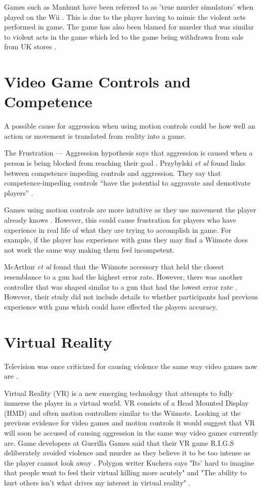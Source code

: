 \documentclass{scrartcl}
\begin{document}
Games such as Manhunt have been referred to as 'true murder simulators' when played on the Wii \cite{Manhunt}. This is due to the player having to mimic the violent acts performed in game. 
The game has also been blamed for murder that was similar to violent acts in the game which led to the game being withdrawn from sale from UK stores \cite{Manhunt2Ban, ManhuntMurder}.  

\section{Video Game Controls and Competence}
A possible cause for aggression when using motion controls could be how well an action or movement is translated from reality into a game.  

The Frustration --- Aggression hypothesis says that aggression is caused when a person is being blocked from reaching their goal \cite{dollard1939frustration}.  Przybylski \textit{et al} found links between competence impeding controls and aggression. They say that competence-impeding controls ``have the potential to aggravate and demotivate players” \cite{przybylski}.

Games using motion controls are more intuitive as they use movement the player already knows \cite{Kim}.   However, this could cause frustration for players who have experience in real life of what they are trying to accomplish in game.  For example, if the player has experience with guns they may find a Wiimote does not work the same way making them feel incompetent.
\bigskip

McArthur \textit{et al} found that the Wiimote accessory that held the closest resemblance to a gun had the highest error rate. However, there was another controller that was shaped similar to a gun that had the lowest error rate \cite{McArthur}.  However, their study did not include details to whether participants had previous experience with guns which could have effected the players accuracy. 

 
\section{Virtual Reality}
Television was once criticized for causing violence the same way video games now are \cite{sherry2001effects}. 

Virtual Reality (VR) is a new emerging technology that attempts to fully immerse the player in a virtual world.   VR consists of a Head Mounted Display (HMD) and often motion controllers similar to the Wiimote. 
Looking at the previous evidence for video games and motion controls it would suggest that VR will soon be accused of causing aggression in the same way video games currently are. 
Game developers at Guerilla Games said that their VR game R.I.G.S deliberately avoided violence and murder as they believe it to be too intense as the player cannot look away \cite{VRViolence}. 
Polygon writer Kuchera says "Its' hard to imagine that people want to feel their virtual killing more acutely"  and  "The ability to hurt others isn't what drives my interest in virtual reality" \cite{PolygonVR}.  
\end{document}

